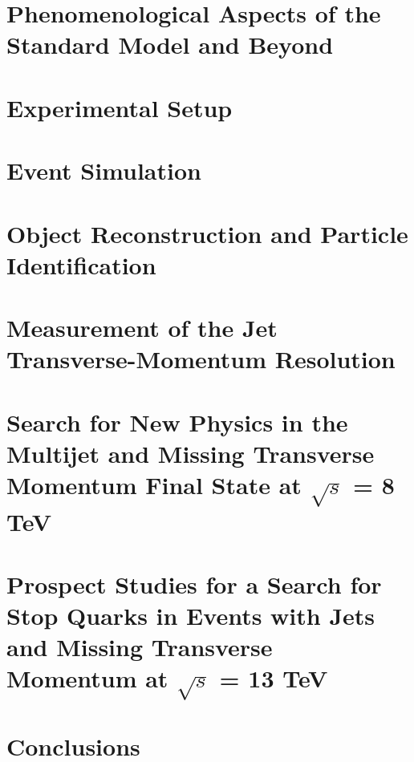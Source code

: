 \documentclass[
twoside,
headsepline,     %
headings=normal,
openright,
numbers=noenddot, %
a4paper
]{scrreprt} %
\begin{document}
\chapter{Phenomenological Aspects of the Standard Model and Beyond} \label{chap:Theory}


\chapter{Experimental Setup} \label{chap:Detector}


\chapter{Event Simulation} \label{chap:Simulation}


\chapter{Object Reconstruction and Particle Identification} \label{chap:Objects}


\chapter{Measurement of the Jet Transverse-Momentum Resolution} \label{chap:Resolution}


\chapter[Search for New Physics with Jets and Missing Transverse Momentum]{Search for New Physics in the Multijet and Missing Transverse Momentum Final State at $\sqrt{s}$ = 8 TeV} \label{chap:RA2}


\chapter[Prospect Studies for a Search for Top Squarks at $\sqrt{s}$ = 13 TeV]{Prospect Studies for a Search for Stop Quarks in Events with Jets and Missing Transverse Momentum at $\sqrt{s}$ = 13 TeV} \label{chap:Stop}


\chapter{Conclusions} \label{chap:Conclusion}


\cleardoublepage

\appendix






\cleardoublepage
\thispagestyle{empty}
\chapter*{~}
%
\end{document}
